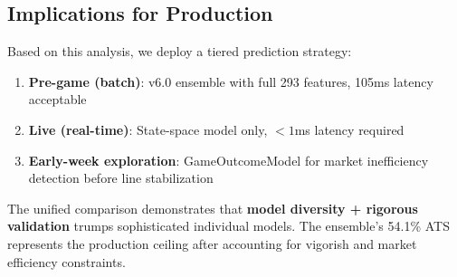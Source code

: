 \subsection{Implications for Production}

Based on this analysis, we deploy a tiered prediction strategy:

\begin{enumerate}[itemsep=2pt,parsep=0pt]
    \item \textbf{Pre-game (batch)}: v6.0 ensemble with full 293 features, 105ms latency acceptable
    \item \textbf{Live (real-time)}: State-space model only, $<1$ms latency required
    \item \textbf{Early-week exploration}: GameOutcomeModel for market inefficiency detection before line stabilization
\end{enumerate}

The unified comparison demonstrates that \textbf{model diversity + rigorous validation} trumps sophisticated individual models. The ensemble's 54.1\% ATS represents the production ceiling after accounting for vigorish and market efficiency constraints.
